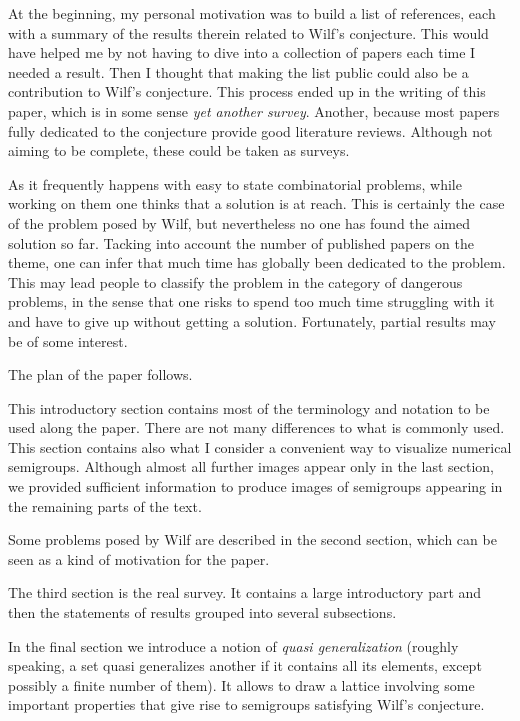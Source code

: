 At the beginning, my personal motivation was to build a list of references, each with a summary of the results therein related to Wilf's conjecture. This would have helped me by not having to dive into a collection of papers each time I needed a result. Then I thought that making the list public could also be a contribution to Wilf's conjecture. This process ended up in the writing of this paper, which is in some sense \emph{yet another survey}. Another, because most papers fully dedicated to the conjecture provide good literature reviews. Although not aiming to be complete, these could be taken as surveys.

As it frequently happens with easy to state combinatorial problems, while working on them one thinks that a solution is at reach. This is certainly the case of the problem posed by Wilf, but nevertheless no one has found the aimed solution so far. Tacking into account the number of published papers on the theme, one can infer that much time has globally been dedicated to the problem. This may lead people to classify the problem in the category of dangerous problems, in the sense that one risks to spend too much time struggling with it and have to give up without getting a solution. Fortunately, partial results may be of some interest.

The plan of the paper follows.

This introductory section contains most of the terminology and notation to be used along the paper. 
There are not many differences to what is commonly used. 
This section contains also what I consider a convenient way to visualize numerical semigroups. Although almost all further images appear only in the last section, we provided sufficient information to produce images of semigroups appearing in the remaining parts of the text.

Some problems posed by Wilf are described in the second section, which can be seen as a kind of motivation for the paper.

The third section is the real survey. It contains a large introductory part and then the statements of results grouped into several subsections.

In the final section we introduce a notion of \emph{quasi generalization} (roughly speaking, a set quasi generalizes another if it contains all its elements, except possibly a finite number of them). It allows to draw a lattice involving some important properties that give rise to semigroups satisfying Wilf's conjecture. 

